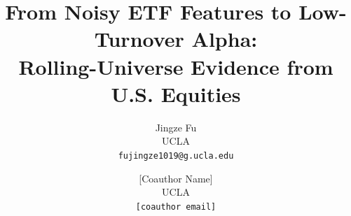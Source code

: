 \documentclass[11pt]{article}
\title{From Noisy ETF Features to Low-Turnover Alpha:\\
Rolling-Universe Evidence from U.S. Equities}
\author{
  Jingze Fu \\
  UCLA \\
  \texttt{fujingze1019@g.ucla.edu}
  \and
  [Coauthor Name] \\
  UCLA \\
  \texttt{[coauthor email]}
}
\date{}
\begin{document}
\maketitle

\begin{abstract}

\end{abstract}










\appendix




\end{document}
